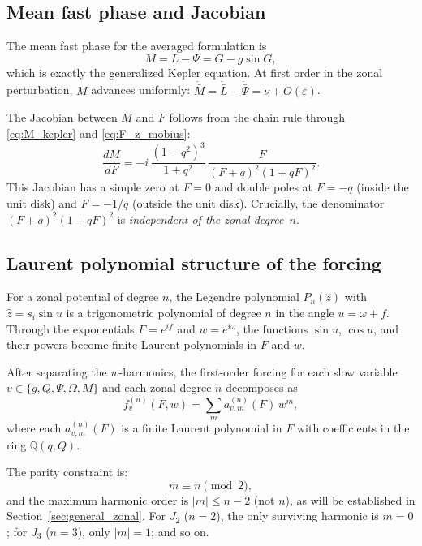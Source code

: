 \documentclass[11pt]{article}
\begin{document}
\subsection{Mean fast phase and Jacobian}

The mean fast phase for the averaged formulation is
\begin{equation}
M = L - \Psi = G - g\sin G,
\label{eq:M_kepler}
\end{equation}
which is exactly the generalized Kepler equation. At first order in the zonal
perturbation, $M$ advances uniformly:
$\dot{\bar M} = \dot{\bar L} - \dot{\bar\Psi} = \nu + O(\varepsilon)$.

The Jacobian between $M$ and $F$ follows from the chain rule through
\eqref{eq:M_kepler} and \eqref{eq:F_z_mobius}:
\begin{equation}
\frac{dM}{dF}
= -i\,\frac{(1-q^2)^3}{1+q^2}\,
\frac{F}{(F+q)^2(1+qF)^2}.
\label{eq:dMdF}
\end{equation}
This Jacobian has a simple zero at $F = 0$ and double poles at
$F = -q$ (inside the unit disk) and $F = -1/q$ (outside the unit disk).
Crucially, the denominator $(F+q)^2(1+qF)^2$ is \emph{independent of the
zonal degree~$n$}.

\subsection{Laurent polynomial structure of the forcing}

For a zonal potential of degree $n$, the Legendre polynomial
$P_n(\hat z)$ with $\hat z = s_i \sin u$ is a trigonometric polynomial
of degree $n$ in the angle $u = \omega + f$. Through the exponentials
$F = e^{if}$ and $w = e^{i\omega}$, the functions $\sin u$, $\cos u$, and
their powers become finite Laurent polynomials in $F$ and $w$.

After separating the $w$-harmonics, the first-order forcing for each slow
variable $v \in \{g, Q, \Psi, \Omega, M\}$ and each zonal degree $n$
decomposes as
\begin{equation}
f^{(n)}_v(F, w)
= \sum_{m} a^{(n)}_{v,m}(F)\, w^m,
\label{eq:forcing_w_decomp}
\end{equation}
where each $a^{(n)}_{v,m}(F)$ is a finite Laurent polynomial in $F$ with
coefficients in the ring $\mathbb{Q}(q, Q)$.

The parity constraint is:
\begin{equation}
m \equiv n \pmod{2},
\end{equation}
and the maximum harmonic order is $|m| \le n-2$ (not $n$), as will be
established in Section~\ref{sec:general_zonal}. For $J_2$ ($n=2$),
the only surviving harmonic is $m = 0$; for $J_3$ ($n=3$), only $|m| = 1$;
and so on.
\end{document}
